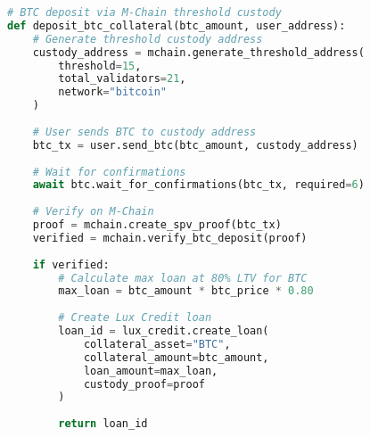 \documentclass[11pt,a4paper]{article}
\begin{document}
\begin{lstlisting}[language=Python, basicstyle=\footnotesize\ttfamily]
# BTC deposit via M-Chain threshold custody
def deposit_btc_collateral(btc_amount, user_address):
    # Generate threshold custody address
    custody_address = mchain.generate_threshold_address(
        threshold=15,
        total_validators=21,
        network="bitcoin"
    )
    
    # User sends BTC to custody address
    btc_tx = user.send_btc(btc_amount, custody_address)
    
    # Wait for confirmations
    await btc.wait_for_confirmations(btc_tx, required=6)
    
    # Verify on M-Chain
    proof = mchain.create_spv_proof(btc_tx)
    verified = mchain.verify_btc_deposit(proof)
    
    if verified:
        # Calculate max loan at 80% LTV for BTC
        max_loan = btc_amount * btc_price * 0.80
        
        # Create Lux Credit loan
        loan_id = lux_credit.create_loan(
            collateral_asset="BTC",
            collateral_amount=btc_amount,
            loan_amount=max_loan,
            custody_proof=proof
        )
        
        return loan_id
\end{lstlisting}
\end{document}
